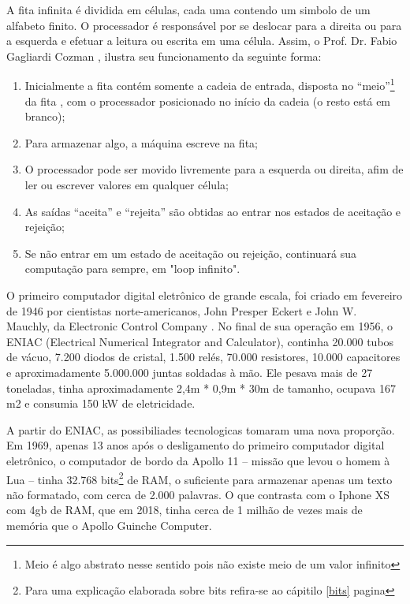 A fita infinita é dividida em células, cada uma contendo um simbolo de um alfabeto finito. O processador é responsável por se deslocar para a direita ou para a esquerda e efetuar a leitura ou escrita em uma célula. Assim, o Prof. Dr. Fabio Gagliardi Cozman \cite{7}, ilustra seu funcionamento da seguinte forma:
\begin{enumerate}
  \item Inicialmente a fita contém somente a cadeia de entrada, disposta no “meio”\footnote{Meio é algo abstrato nesse sentido pois não existe meio de um valor infinito} da fita , com o processador posicionado no início da cadeia (o resto está em branco);
  \item Para armazenar algo, a máquina escreve na fita;
  \item O processador pode ser movido livremente para a esquerda ou direita, afim de ler ou escrever valores em qualquer célula;
  \item As saídas ``aceita'' e ``rejeita'' são obtidas ao entrar nos estados de aceitação e rejeição;
  \item Se não entrar em um estado de aceitação ou rejeição, continuará sua computação para sempre, em  "loop infinito".
\end{enumerate}

O primeiro computador digital eletrônico de grande escala, foi criado em fevereiro de 1946 por cientistas norte-americanos, John Presper Eckert e John W. Mauchly, da Electronic Control Company . No final de sua operação em 1956, o ENIAC (Electrical Numerical Integrator and Calculator), continha 20.000 tubos de vácuo, 7.200 diodos de cristal, 1.500 relés, 70.000 resistores, 10.000 capacitores e aproximadamente 5.000.000 juntas soldadas à mão. Ele pesava mais de 27 toneladas, tinha aproximadamente 2,4m * 0,9m * 30m de tamanho, ocupava 167 m2 e consumia 150 kW de eletricidade. \cite{2}

A partir do ENIAC, as possibiliades tecnologicas tomaram uma nova proporção. Em 1969, apenas 13 anos após o desligamento do primeiro computador digital eletrônico, o computador de bordo da Apollo 11 – missão que levou o homem  à Lua – tinha 32.768 bits\footnote{Para uma explicação elaborada sobre bits refira-se ao cápitilo \ref{bits} pagina \pageref{bits}} de RAM, o suficiente para armazenar apenas um texto não formatado, com cerca de 2.000 palavras. O que contrasta com o Iphone XS com 4gb de RAM, que em 2018, tinha cerca de 1 milhão de vezes mais de memória que o Apollo Guinche Computer. \cite{5}

